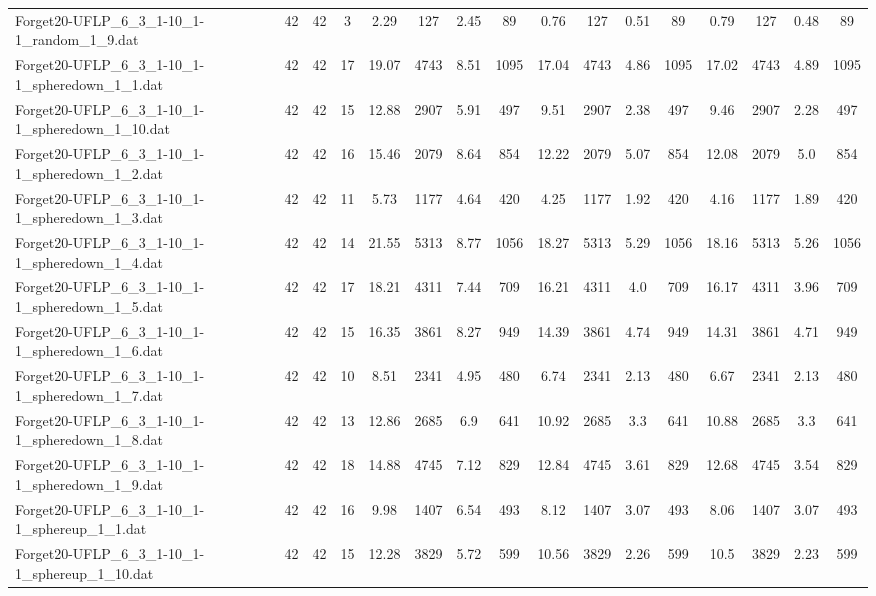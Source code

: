 \begin{sidewaystable}[!ht]
{\begin{tabular}{lccccccccccccccc}
Forget20-UFLP\_6\_3\_1-10\_1-1\_random\_1\_9.dat & 42 & 42 & 3 & 2.29 & 127 & 2.45 & 89 & 0.76 & 127 & 0.51 & 89 & 0.79 & 127 &  \textcolor{blue2}{0.48} & 89 \\
Forget20-UFLP\_6\_3\_1-10\_1-1\_spheredown\_1\_1.dat & 42 & 42 & 17 & 19.07 & 4743 & 8.51 & 1095 & 17.04 & 4743 &  \textcolor{blue2}{4.86} & 1095 & 17.02 & 4743 & 4.89 & 1095 \\
Forget20-UFLP\_6\_3\_1-10\_1-1\_spheredown\_1\_10.dat & 42 & 42 & 15 & 12.88 & 2907 & 5.91 & 497 & 9.51 & 2907 & 2.38 & 497 & 9.46 & 2907 &  \textcolor{blue2}{2.28} & 497 \\
Forget20-UFLP\_6\_3\_1-10\_1-1\_spheredown\_1\_2.dat & 42 & 42 & 16 & 15.46 & 2079 & 8.64 & 854 & 12.22 & 2079 & 5.07 & 854 & 12.08 & 2079 &  \textcolor{blue2}{5.0} & 854 \\
Forget20-UFLP\_6\_3\_1-10\_1-1\_spheredown\_1\_3.dat & 42 & 42 & 11 & 5.73 & 1177 & 4.64 & 420 & 4.25 & 1177 & 1.92 & 420 & 4.16 & 1177 & 1.89 & 420 \\
Forget20-UFLP\_6\_3\_1-10\_1-1\_spheredown\_1\_4.dat & 42 & 42 & 14 & 21.55 & 5313 & 8.77 & 1056 & 18.27 & 5313 & 5.29 & 1056 & 18.16 & 5313 &  \textcolor{blue2}{5.26} & 1056 \\
Forget20-UFLP\_6\_3\_1-10\_1-1\_spheredown\_1\_5.dat & 42 & 42 & 17 & 18.21 & 4311 & 7.44 & 709 & 16.21 & 4311 & 4.0 & 709 & 16.17 & 4311 & 3.96 & 709 \\
Forget20-UFLP\_6\_3\_1-10\_1-1\_spheredown\_1\_6.dat & 42 & 42 & 15 & 16.35 & 3861 & 8.27 & 949 & 14.39 & 3861 & 4.74 & 949 & 14.31 & 3861 & 4.71 & 949 \\
Forget20-UFLP\_6\_3\_1-10\_1-1\_spheredown\_1\_7.dat & 42 & 42 & 10 & 8.51 & 2341 & 4.95 & 480 & 6.74 & 2341 & 2.13 & 480 & 6.67 & 2341 & 2.13 & 480 \\
Forget20-UFLP\_6\_3\_1-10\_1-1\_spheredown\_1\_8.dat & 42 & 42 & 13 & 12.86 & 2685 & 6.9 & 641 & 10.92 & 2685 & 3.3 & 641 & 10.88 & 2685 & 3.3 & 641 \\
Forget20-UFLP\_6\_3\_1-10\_1-1\_spheredown\_1\_9.dat & 42 & 42 & 18 & 14.88 & 4745 & 7.12 & 829 & 12.84 & 4745 & 3.61 & 829 & 12.68 & 4745 &  \textcolor{blue2}{3.54} & 829 \\
Forget20-UFLP\_6\_3\_1-10\_1-1\_sphereup\_1\_1.dat & 42 & 42 & 16 & 9.98 & 1407 & 6.54 & 493 & 8.12 & 1407 & 3.07 & 493 & 8.06 & 1407 & 3.07 & 493 \\
Forget20-UFLP\_6\_3\_1-10\_1-1\_sphereup\_1\_10.dat & 42 & 42 & 15 & 12.28 & 3829 & 5.72 & 599 & 10.56 & 3829 & 2.26 & 599 & 10.5 & 3829 &  \textcolor{blue2}{2.23} & 599 \\

\end{tabular}}
\end{sidewaystable}
